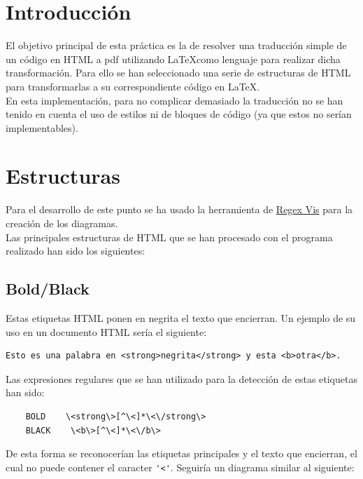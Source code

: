 \documentclass[12pt]{article}
\begin{document}
\portada[%
        titulo=Modelos de Computación,
        subtitulo=Práctica Lex/Flex,
        autor=Jesús Muñoz Velasco\\Daniel Morán Sánchez,
        año=Curso 2024-2025,
        imagen=../../../../documents/_assets/Logo-UGR-Black.png]

\tableofcontents

\newpage

\section{Introducción}

El objetivo principal de esta práctica es la de resolver una traducción simple de un código en HTML a pdf utilizando \LaTeX como lenguaje para realizar dicha transformación. Para ello se han seleccionado una serie de estructuras de HTML para transformarlas a su correspondiente código en \LaTeX.\\

En esta implementación, para no complicar demasiado la traducción no se han tenido en cuenta el uso de estilos ni de bloques de código (ya que estos no serían implementables).

\section{Estructuras}

Para el desarrollo de este punto se ha usado la herramienta de \href{https://regex-vis.com/}{Regex Vis} para la creación de los diagramas.\\

Las principales estructuras de HTML que se han procesado con el programa realizado han sido los siguientes:

\subsection{Bold/Black}
Estas etiquetas HTML ponen en negrita el texto que encierran. Un ejemplo de su uso en un documento HTML sería el siguiente:
\begin{verbatim}
Esto es una palabra en <strong>negrita</strong> y esta <b>otra</b>.
\end{verbatim}
Las expresiones regulares que se han utilizado para la detección de estas etiquetas han sido:
\begin{verbatim}
    BOLD    \<strong\>[^\<]*\<\/strong\>
    BLACK    \<b\>[^\<]*\<\/b\>
\end{verbatim}
De esta forma se reconocerían las etiquetas principales y el texto que encierran, el cual no puede contener el caracter \verb|'<'|. Seguiría un diagrama similar al siguiente:
\end{document}
